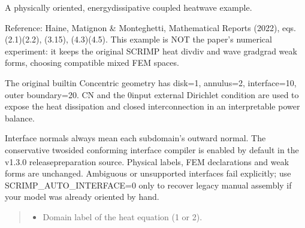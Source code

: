 \documentclass[letterpaper,10pt,english]{sphinxmanual}
\begin{document}
\begin{fulllineitems}
\label{\detokenize{examples/heat_wave:examples.heat_wave.heat_wave_eq}}
\pysigstartsignatures
\pysiglinewithargsret
{}
{\sphinxparamcomma {}\sphinxparamcomma {}\sphinxparamcomma {}\sphinxparamcomma {}\sphinxparamcomma {}\sphinxparamcomma {}\sphinxparamcomma {}\sphinxparamcomma {}\sphinxparamcomma {}\sphinxparamcomma {}\sphinxparamcomma {}}
{}
\pysigstopsignatures
\sphinxAtStartPar
A physically oriented, energy\sphinxhyphen{}dissipative coupled heat\sphinxhyphen{}wave example.

\sphinxAtStartPar
Reference: Haine, Matignon \& Monteghetti, Mathematical Reports (2022),
eqs. (2.1)\sphinxhyphen{}(2.2), (3.15), (4.3)\sphinxhyphen{}(4.5). This example is NOT the paper’s
numerical experiment: it keeps the original SCRIMP heat div\sphinxhyphen{}div and
wave grad\sphinxhyphen{}grad weak forms, choosing compatible mixed FEM spaces.

\sphinxAtStartPar
The original built\sphinxhyphen{}in Concentric geometry has disk=1, annulus=2,
interface=10, outer boundary=20. CN and the 0\sphinxhyphen{}input external
Dirichlet condition are used to expose the heat dissipation and
closed interconnection in an interpretable power balance.

\sphinxAtStartPar
Interface normals always mean each subdomain’s outward normal.
The conservative two\sphinxhyphen{}sided conforming interface compiler is
enabled by default in the v1.3.0 release\sphinxhyphen{}preparation source.
Physical labels, FEM declarations and weak forms are unchanged.
Ambiguous or unsupported interfaces fail explicitly; use
SCRIMP\_AUTO\_INTERFACE=0 only to recover legacy manual assembly
if your model was already oriented by hand.
\begin{quote}\begin{description}
\begin{itemize}
\item {} 
\sphinxAtStartPar
{} \textendash{} Domain label of the heat equation (1 or 2).


\end{itemize}
\end{description}
\end{quote}
\end{fulllineitems}
\end{document}

